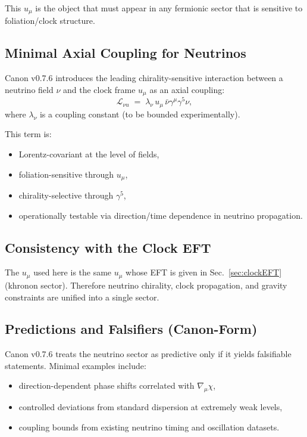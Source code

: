 \documentclass[10pt]{article}
\begin{document}
This $u_\mu$ is the object that must appear in any fermionic sector that is
sensitive to foliation/clock structure.

\subsection{Minimal Axial Coupling for Neutrinos}

Canon v0.7.6 introduces the leading chirality-sensitive interaction between
a neutrino field $\nu$ and the clock frame $u_\mu$ as an axial coupling:
\begin{equation}
    \mathcal{L}_{\nu u}
    \;=\;
    \lambda_\nu\,u_\mu\,\bar{\nu}\gamma^\mu\gamma^5\nu,
    \label{eq:axial_coupling}
\end{equation}
where $\lambda_\nu$ is a coupling constant (to be bounded experimentally).

This term is:
\begin{itemize}
    \item Lorentz-covariant at the level of fields,
    \item foliation-sensitive through $u_\mu$,
    \item chirality-selective through $\gamma^5$,
    \item operationally testable via direction/time dependence in neutrino propagation.
\end{itemize}

\subsection{Consistency with the Clock EFT}

The $u_\mu$ used here is the same $u_\mu$ whose EFT is given in
Sec.~\ref{sec:clockEFT} (khronon sector). Therefore neutrino chirality,
clock propagation, and gravity constraints are unified into a single sector.

\subsection{Predictions and Falsifiers (Canon-Form)}

Canon v0.7.6 treats the neutrino sector as predictive only if it yields
falsifiable statements. Minimal examples include:
\begin{itemize}
    \item direction-dependent phase shifts correlated with $\nabla_\mu\chi$,
    \item controlled deviations from standard dispersion at extremely weak levels,
    \item coupling bounds from existing neutrino timing and oscillation datasets.
\end{itemize}
\end{document}
